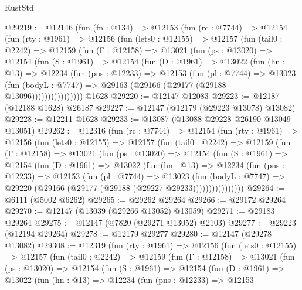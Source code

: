 \begin{lexlean}{RustStd}
\begin{coremodule}
@29219 := @12146
    (fun (fn : @134) =>
    @12153
      (fun (rc : @7744) =>
      @12154
        (fun (rty : @1961) =>
        @12156
          (fun (lets0 : @12155) =>
          @12157
            (fun (tail0 : @2242) =>
            @12159
              (fun (Γ : @12158) =>
              @13021
                (fun (ps : @13020) =>
                @12154
                  (fun (S : @1961) =>
                  @12154
                    (fun (D : @1961) =>
                    @13022
                      (fun (hn : @13) =>
                      @12234
                        (fun (pns : @12233) =>
                        @12153
                          (fun (pl : @7744) =>
                          @13023
                            (fun (bodyL : @7747) =>
                            @29163 (@29166 (@29177 (@29188 @13096))))))))))))))))
    @1628
@29220 := @12147 @12083
@29223 := @12187 (@12188 @1628) @26187
@29227 := @12147 (@12179 (@29223 @13078) @13082)
@29228 := @12211 @1628
@29233 := @13087 (@13088 @29228 @26190 @13049 @13051)
@29262 := @12316
    (fun (rc : @7744) =>
    @12154
      (fun (rty : @1961) =>
      @12156
        (fun (lets0 : @12155) =>
        @12157
          (fun (tail0 : @2242) =>
          @12159
            (fun (Γ : @12158) =>
            @13021
              (fun (ps : @13020) =>
              @12154
                (fun (S : @1961) =>
                @12154
                  (fun (D : @1961) =>
                  @13022
                    (fun (hn : @13) =>
                    @12234
                      (fun (pns : @12233) =>
                      @12153
                        (fun (pl : @7744) =>
                        @13023
                          (fun (bodyL : @7747) =>
                          @29220 (@29166 (@29177 (@29188 (@29227 @29233))))))))))))))))
@29264 := @6111 (@5002 @6262)
@29265 := @29262 @29264
@29266 := @29172 @29264
@29270 := @12147 (@13039 (@29266 @13052) @13059)
@29271 := @29183 @29264
@29275 := @12147 (@7820 (@29271 @13052) @2103)
@29277 := @29223 (@12194 @29264)
@29278 := @12179 @29277
@29280 := @12147 (@29278 @13082)
@29308 := @12319
    (fun (rty : @1961) =>
    @12156
      (fun (lets0 : @12155) =>
      @12157
        (fun (tail0 : @2242) =>
        @12159
          (fun (Γ : @12158) =>
          @13021
            (fun (ps : @13020) =>
            @12154
              (fun (S : @1961) =>
              @12154
                (fun (D : @1961) =>
                @13022
                  (fun (hn : @13) =>
                  @12234
                    (fun (pns : @12233) =>
                    @12153

\end{coremodule}
\end{lexlean}
